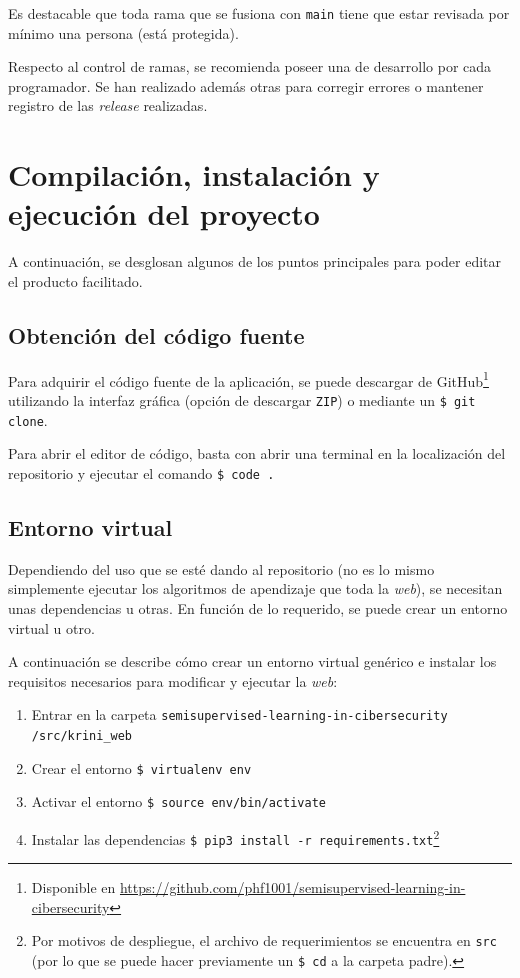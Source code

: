 \begin{itemize}
Es destacable que toda rama que se fusiona con \texttt{main} tiene que estar revisada por mínimo una persona (está protegida).

Respecto al control de ramas, se recomienda poseer una de desarrollo por cada programador. Se han realizado además otras para corregir errores o mantener registro de las \textit{release} realizadas.



\end{itemize}

\section{Compilación, instalación y ejecución del proyecto}
\label{s:inst-prog}

A continuación, se desglosan algunos de los puntos principales para poder editar el producto facilitado.

\subsection{Obtención del código fuente}

Para adquirir el código fuente de la aplicación, se puede descargar de GitHub\footnote{Disponible en \url{https://github.com/phf1001/semisupervised-learning-in-cibersecurity}} utilizando la interfaz gráfica (opción de descargar \texttt{ZIP}) o mediante un \texttt{\$ git clone}.

Para abrir el editor de código, basta con abrir una terminal en la localización del repositorio y ejecutar el comando \texttt{\$ code .}

\subsection{Entorno virtual}

Dependiendo del uso que se esté dando al repositorio (no es lo mismo simplemente ejecutar los algoritmos de apendizaje que toda la \textit{web}), se necesitan unas dependencias u otras. En función de lo requerido, se puede crear un entorno virtual u otro.

A continuación se describe cómo crear un entorno virtual genérico e instalar los requisitos necesarios para modificar y ejecutar la \textit{web}:

\begin{enumerate}
	\item Entrar en la carpeta \texttt{semisupervised-learning-in-cibersecurity /src/krini\_web}
	\item Crear el entorno \texttt{\$ virtualenv env}
	\item Activar el entorno \texttt{\$ source  env/bin/activate}
	\item Instalar las dependencias \texttt{\$ pip3 install -r requirements.txt}\footnote{Por motivos de despliegue, el archivo de requerimientos se encuentra en \texttt{src} (por lo que se puede hacer previamente un \texttt{\$ cd} a la carpeta padre).}
\end{enumerate}

